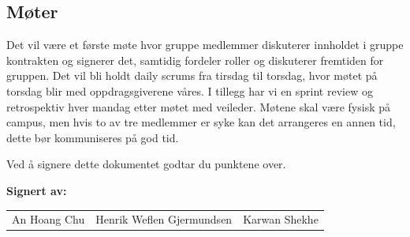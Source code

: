 \subsection{Møter}

Det vil være et første møte hvor gruppe medlemmer diskuterer innholdet i gruppe kontrakten og signerer det, samtidig fordeler roller og diskuterer fremtiden for gruppen. Det vil bli holdt daily scrums fra tirsdag til torsdag, hvor møtet på torsdag blir med oppdragsgiverene våres. I tillegg har vi en sprint review og retrospektiv hver mandag etter møtet med veileder. Møtene skal være fysisk på campus, men hvis to av tre medlemmer er syke kan det arrangeres en annen tid, dette bør kommuniseres på god tid.

Ved å signere dette dokumentet godtar du punktene over.

\vspace{2em}
\textbf{Signert av:}

\vspace{3em}
\begin{tabular}{p{}p{}p{}}
An Hoang Chu & Henrik Weflen Gjermundsen & Karwan Shekhe \\
\end{tabular}

\endgroup

